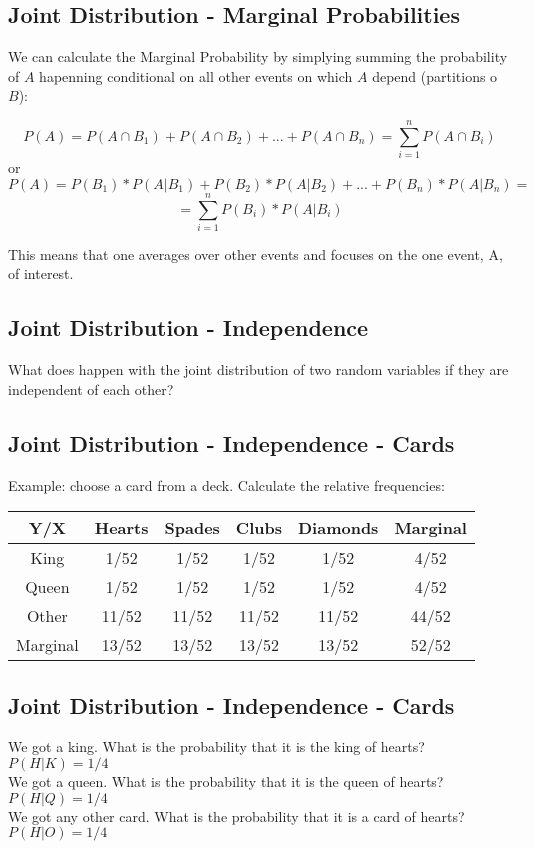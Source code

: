 \documentclass[11pt]{article}
\begin{document}
	\subsection*{Joint Distribution - Marginal Probabilities}
	
	We can calculate the Marginal Probability by simplying summing the probability of $A$ hapenning conditional on all other events on which $A$ depend (partitions o $B$):
	
\[P(A) = P(A\cap B_1) + P(A\cap B_2) + ... + P(A \cap B_n) = \sum\limits_{i=1}^n P(A\cap B_i)  \]
or
\[P(A) = P(B_1)*P(A|B_1) + P(B_2)*P(A|B_2) +...+ P(B_n)*P(A|B_n)= \]
\[= \sum\limits_{i=1}^n P(B_i)*P(A|B_i) \]

This means that one averages over other events and focuses on the one event, A, of interest.

	\subsection*{Joint Distribution - Independence}
	What does happen with the joint distribution of two random variables if they are independent of each other?
	


	\subsection*{Joint Distribution - Independence - Cards}
	Example: choose a card from a deck. Calculate the relative frequencies:\newline\\
	\begin{tabular}{|c|cccc|c|}
\hline
	Y/X & Hearts & Spades & Clubs & Diamonds & Marginal \\
\hline
	King & 1/52 & 1/52 & 1/52 & 1/52 & 4/52\\
	Queen & 1/52 & 1/52 & 1/52 & 1/52 & 4/52\\
	Other & 11/52 & 11/52 & 11/52 & 11/52 & 44/52\\
\hline
	Marginal & 13/52 & 13/52 & 13/52 & 13/52 & 52/52\\
\hline

\end{tabular}


	\subsection*{Joint Distribution - Independence - Cards}
We got a king. What is the probability that it is the king of hearts? $P(H|K)=1/4$\newline\\	
We got a queen. What is the probability that it is the queen of hearts? $P(H|Q)=1/4$\newline\\	
We got any other card. What is the probability that it is a card of hearts? $P(H|O)=1/4$
\end{document}
